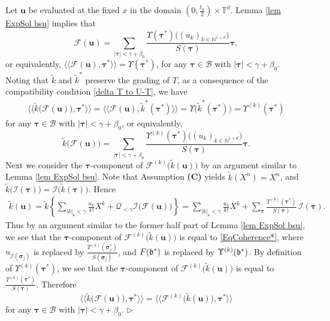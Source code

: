 \documentclass[10pt, reqno]{amsart}
\numberwithin{subsection}{section}
\numberwithin{subsubsection}{subsection}
\numberwithin{equation}{section} %
\newenvironment{Dem}[1][\unskip]{%
    \begin{list}{\hspace{1.15cm}{\sf \textbf{{\small Proof #1 --}}}}{%
        \setlength{\topsep}{0pt}%
        \setlength{\leftmargin}{0pt}%
        \setlength{\rightmargin}{0pt}%
        \setlength{\listparindent}{0pt}%
        \setlength{\itemindent}{0pt}%
        \setlength{\parsep}{0pt}%
        \addtolength{\leftmargin}{0pt}%
        \addtolength{\rightmargin}{0pt}%
    } \item }{\hfill $\rhd$\end{list}\smallskip}
\theoremstyle{mystyle}
\theoremstyle{mystyle2}
\theoremstyle{mystyle3}
\newcommand{\mcF}{\boldsymbol{p}}
\newcommand{\bsu}{\boldsymbol{u}}
\newcommand{\bstau}{\boldsymbol{\tau}}
\newcommand{\bssigma}{\boldsymbol{\sigma}}
\newcommand{\wangle}[1]{\langle\!\langle#1\rangle\!\rangle}
\newcommand{\mfs}{\mathfrak{s}}
\newcommand\bbN{\mathbb{N}}
\newcommand{\bbT}{\mathbb{T}}
\newcommand{\mcB}{\mathcal{B}}
\renewcommand{\mcF}{\mathcal{F}}
\newcommand{\mcI}{\mathcal{I}}
\newcommand{\mcQ}{\mathcal{Q}}
\begin{document}
\begin{Dem}
Let $\bsu$ be evaluated at the fixed $x$ in the domain $(0,\frac{t_0}2)\times\bbT^d$.
Lemma \ref{lem ExpSol bsu} implies that 
$$
\mcF(\bsu)=\sum_{|\bstau|<\gamma+\beta_0}\frac{\Upsilon(\bstau^*)\big((u_k)_{k\in\bbN^{1+d}}\big)}{S(\bstau)}\bstau,
$$
or equivalently, $\wangle{\mcF(\bsu),\bstau^*} = 
\Upsilon(\bstau^*)$, for any $\bstau\in \mcB$ with $|\bstau|<\gamma+\beta_0$. Noting that $\widetilde{k}$ and $\widetilde{k}^*$ preserve the grading of $T$, as a consequence of the compatibility condition \eqref{delta T to U-T}, we have
\begin{align*}
\wangle{\widetilde{k}\big(\mcF(\bsu)\big),\bstau^*}
= \wangle{\mcF(\bsu),\widetilde{k}^*(\bstau^*)}
= \Upsilon\big(\widetilde{k}^*(\bstau^*)\big)
= \Upsilon^{(k)}(\bstau^*)
\end{align*}
for any $\bstau\in \mcB$ with $|\bstau|<\gamma+\beta_0$, or equivalently,
$$
\widetilde{k}\big(\mcF(\bsu)\big)=\sum_{|\bstau|<\gamma+\beta_0}\frac{\Upsilon^{(k)}(\bstau^*)\big((u_k)_{k\in\bbN^{1+d}}\big)}{S(\bstau)}\bstau.
$$
Next we consider the $\bstau$-component of $\mcF^{(k)}\big(\widetilde{k}(\bsu)\big)$ by an argument similar to Lemma \ref{lem ExpSol bsu}. Note that Assumption \textbf{\textsf{(C)}} yields $\widetilde{k}(X^n) = 
X^n$, and $\widetilde{k}\big(\mcI(\bstau)\big) = \mcI\big(\widetilde{k}(\bstau)\big)$. Hence
\begin{align*}
\widetilde{k}(\bsu)
= \widetilde{k}\left\{\sum_{|k|_\mfs<\gamma}\frac{u_k}{k!}X^k+\mcQ_{<\gamma}\mcI\big(\mcF(\bsu)\big)\right\}
= \sum_{|k|_\mfs<\gamma}\frac{u_k}{k!}X^k+ \sum_{\bstau}\frac{\Upsilon^{(k)}(\bstau^*)}{S(\bstau)}\,\mcI(\bstau).
\end{align*}
Thus by an argument similar to the former half part of Lemma \ref{lem ExpSol bsu}, we see that the $\bstau$-component of $\mcF^{(k)}\big(\widetilde{k}(\bsu)\big)$ is equal to \eqref{EqCoherence*}, where $u_{\mcI(\bssigma_j)}$ is replaced by $\frac{\Upsilon^{(k)}(\bssigma_j^*)}{S(\bssigma_j)}$, and $F(\frak{b}^*)$ is replaced by $\Upsilon^{(k)}(\frak{b}^*)$.
By definition of $\Upsilon^{(k)}(\bstau^*)$, we see that the $\bstau$-component of $\mcF^{(k)}\big(\widetilde{k}(\bsu)\big)$ is equal to $\frac{\Upsilon^{(k)}(\bstau^*)}{S(\bstau)}$.
Therefore
$$
\wangle{\widetilde{k}\big(\mcF(\bsu)\big),\bstau^*}=\wangle{\mcF^{(k)}\big(\widetilde{k}(\bsu)\big),\bstau^*}
$$ 
for any $\bstau\in \mcB$ with $|\bstau|<\gamma+\beta_0$.
\end{Dem}

\medskip
\end{document}
